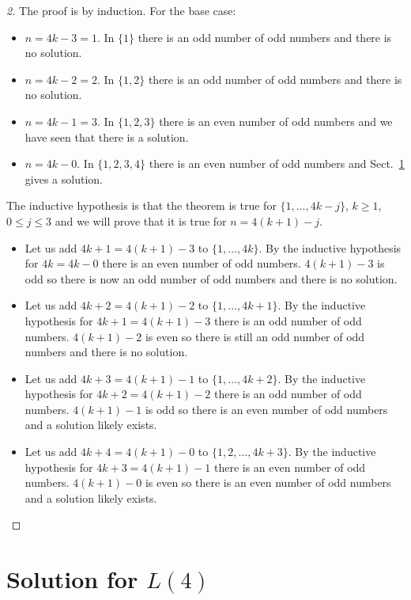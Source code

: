 \begin{proof}[2] 
The proof is by induction.
For the base case:
\begin{itemize}
\item $n=4k-3=1$. In $\{1\}$ there is an odd number of odd numbers and there is no solution.
\item $n=4k-2=2$. In $\{1,2\}$ there is an odd number of odd numbers and there is no solution.
\item $n=4k-1=3$. In $\{1,2,3\}$ there is an even number of odd numbers and we have seen that there is a solution.
\item $n=4k-0$. In $\{1,2,3,4\}$ there is an even number of odd numbers and Sect.~\ref{s.langford-four} gives a solution.
\end{itemize}

The inductive hypothesis is that the theorem is true for $\{1,\ldots,4k-j\}$, $k\ge 1$, $0\leq j\leq 3$ and we will prove that it is true for $n=4(k+1)-j$.

\begin{itemize}
\item Let us add $4k+1=4(k+1)-3$ to $\{1,\ldots,4k\}$. By the inductive hypothesis for $4k=4k-0$ there is an even number of odd numbers. $4(k+1)-3$ is odd so there is now an odd number of odd numbers and there is no solution.
\item Let us add $4k+2=4(k+1)-2$ to $\{1,\ldots,4k+1\}$. By the inductive hypothesis for $4k+1=4(k+1)-3$ there is an odd number of odd numbers. $4(k+1)-2$ is even so there is still an odd number of odd numbers and there is no solution.
\item Let us add $4k+3=4(k+1)-1$ to $\{1,\ldots,4k+2\}$. By the inductive hypothesis for $4k+2=4(k+1)-2$ there is an odd number of odd numbers. $4(k+1)-1$ is odd so there is an even number of odd numbers and a solution likely exists.
\item Let us add $4k+4=4(k+1)-0$ to $\{1,2,\ldots,4k+3\}$. By the inductive hypothesis for $4k+3=4(k+1)-1$ there is an even number of odd numbers. $4(k+1)-0$ is even so there is an even number of odd numbers and a solution likely exists.
\end{itemize}
\end{proof}


\newpage

\section{Solution for $L(4)$}\label{s.langford-four}


